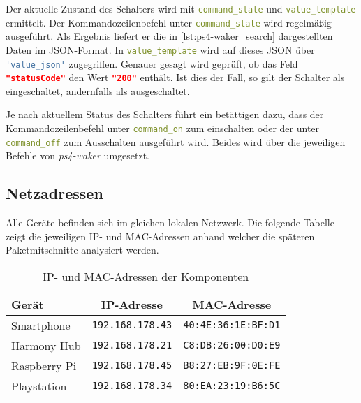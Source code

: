 Der aktuelle Zustand des Schalters wird mit \lstinline[language=yaml]{command_state} und
\lstinline[language=yaml]{value_template} ermittelt.
Der Kommandozeilenbefehl unter \lstinline[language=yaml]{command_state} wird regelmäßig ausgeführt.
Als Ergebnis liefert er die in \autoref{lst:ps4-waker_search} dargestellten Daten im JSON-Format.
In \lstinline[language=yaml]{value_template} wird auf dieses JSON über
\lstinline[language=yaml]{'value_json'} zugegriffen.
Genauer gesagt wird geprüft,
ob das Feld \lstinline[language=json]{"statusCode"} den Wert
\lstinline[language=json]{"200"} enthält.
Ist dies der Fall, so gilt der Schalter als eingeschaltet, andernfalls als ausgeschaltet.



Je nach aktuellem Status des Schalters führt ein betättigen dazu, dass der Kommandozeilenbefehl unter \lstinline[language=yaml]{command_on} zum einschalten
oder der unter \lstinline[language=yaml]{command_off} zum Ausschalten ausgeführt wird.
Beides wird über die jeweiligen Befehle von \textit{ps4-waker} umgesetzt.

\subsection{Netzadressen}\label{sec:aufbau-adressen}
Alle Geräte befinden sich im gleichen lokalen Netzwerk.
Die folgende Tabelle zeigt die jeweiligen IP- und MAC-Adressen anhand welcher die
späteren Paketmitschnitte analysiert werden.

\begin{table}[h!]
    \centering
    \begin{tabular}{l||c|c}
        Gerät           & IP-Adresse      &  MAC-Adresse          \\
        \hline
        \hline
        Smartphone      & \texttt{192.168.178.43}  &  \texttt{40:4E:36:1E:BF:D1}  \\
        \hline
        Harmony Hub     & \texttt{192.168.178.21}  &  \texttt{C8:DB:26:00:D0:E9}  \\
        \hline
        Raspberry Pi    & \texttt{192.168.178.45}  &  \texttt{B8:27:EB:9F:0E:FE}  \\
        \hline
        Playstation     & \texttt{192.168.178.34}  &  \texttt{80:EA:23:19:B6:5C}   \\
    \end{tabular}
    \caption{IP- und MAC-Adressen der Komponenten}
    \label{ex:netzadressen}
\end{table}